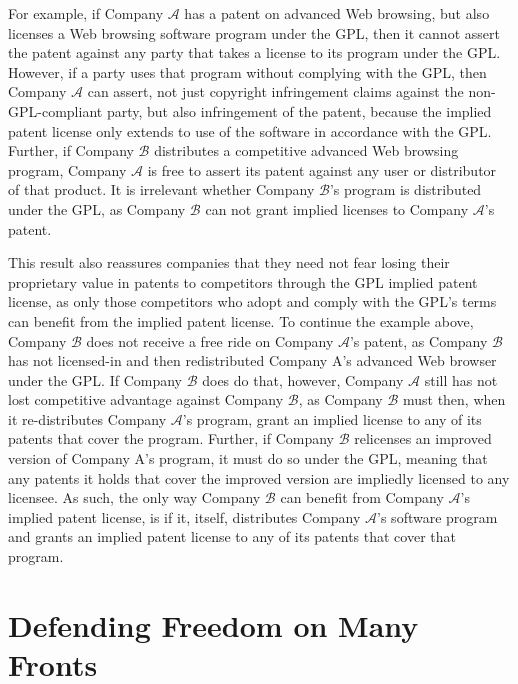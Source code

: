 \documentclass[11pt, letterpaper]{book}
\begin{document}
\newcommand{\compB}{$\mathcal{B}$}
\newcommand{\compA}{$\mathcal{A}$}

For example, if Company \compA{} has a patent on advanced Web browsing, but
also licenses a Web browsing software program under the GPL, then it
cannot assert the patent against any party that takes a license to its
program under the GPL. However, if a party uses that program without
complying with the GPL, then Company \compA{} can assert, not just copyright
infringement claims against the non-GPL-compliant party, but also
infringement of the patent, because the implied patent license only
extends to use of the software in accordance with the GPL. Further, if
Company \compB{} distributes a competitive advanced Web browsing program,
Company \compA{} is free to assert its patent against any user or
distributor of that product. It is irrelevant whether Company \compB's
program is distributed under the GPL, as Company \compB{} can not grant
implied licenses to Company \compA's patent.

This result also reassures companies that they need not fear losing their
proprietary value in patents to competitors through the GPL implied patent
license, as only those competitors who adopt and comply with the GPL's
terms can benefit from the implied patent license. To continue the
example above, Company \compB{} does not receive a free ride on Company
\compA's patent, as Company \compB{} has not licensed-in and then
redistributed Company A's advanced Web browser under the GPL. If Company
\compB{} does do that, however, Company \compA{} still has not lost
competitive advantage against Company \compB{}, as Company \compB{} must then,
when it re-distributes Company \compA's program, grant an implied license
to any of its patents that cover the program. Further, if Company \compB{}
relicenses an improved version of Company A's program, it must do so under
the GPL, meaning that any patents it holds that cover the improved version
are impliedly licensed to any licensee. As such, the only way Company
\compB{} can benefit from Company \compA's implied patent license, is if it,
itself, distributes Company \compA's software program and grants an
implied patent license to any of its patents that cover that program.

\chapter{Defending Freedom on Many Fronts}
\end{document}
